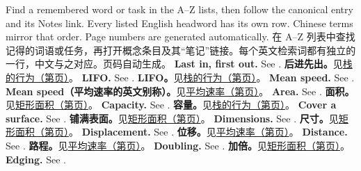  {Find a remembered word or task in the A--Z lists, then follow the canonical entry and its Notes link. Every listed English headword has its own row. Chinese terms mirror that order. Page numbers are generated automatically.}
 {在 A--Z 列表中查找记得的词语或任务，再打开概念条目及其“笔记”链接。每个英文检索词都有独立的一行，中文与之对应。页码自动生成。}
 {\textbf{Last in, first out.} See .}
 {\textbf{后进先出。}见\hyperref[concept-stack]{栈的行为（第\pageref*{concept-stack}页）}。}
 {\textbf{LIFO.} See .}
 {\textbf{LIFO。}见\hyperref[concept-stack]{栈的行为（第\pageref*{concept-stack}页）}。}
 {\textbf{Mean speed.} See .}
 {\textbf{Mean speed（平均速率的英文别称）。}见\hyperref[concept-speed]{平均速率（第\pageref*{concept-speed}页）}。}
 {\textbf{Area.} See .}
 {\textbf{面积。}见\hyperref[concept-area]{矩形面积（第\pageref*{concept-area}页）}。}
 {\textbf{Capacity.} See .}
 {\textbf{容量。}见\hyperref[concept-stack]{栈的行为（第\pageref*{concept-stack}页）}。}
 {\textbf{Cover a surface.} See .}
 {\textbf{铺满表面。}见\hyperref[concept-area]{矩形面积（第\pageref*{concept-area}页）}。}
 {\textbf{Dimensions.} See .}
 {\textbf{尺寸。}见\hyperref[concept-area]{矩形面积（第\pageref*{concept-area}页）}。}
 {\textbf{Displacement.} See .}
 {\textbf{位移。}见\hyperref[concept-speed]{平均速率（第\pageref*{concept-speed}页）}。}
 {\textbf{Distance.} See .}
 {\textbf{路程。}见\hyperref[concept-speed]{平均速率（第\pageref*{concept-speed}页）}。}
 {\textbf{Doubling.} See .}
 {\textbf{加倍。}见\hyperref[concept-area]{矩形面积（第\pageref*{concept-area}页）}。}
 {\textbf{Edging.} See .}
